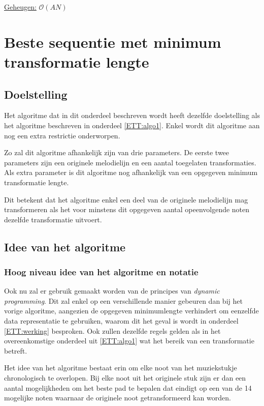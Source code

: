 \begin{center}
\underline{Geheugen:} $\mathcal{O}(AN)$
\end{center}

\section{Beste sequentie met minimum transformatie lengte}
\label{ETT:algo2}

\subsection{Doelstelling}
Het algoritme dat in dit onderdeel beschreven wordt heeft dezelfde doelstelling als het algoritme beschreven in onderdeel \ref{ETT:algo1}. Enkel wordt dit algoritme aan nog een extra restrictie onderworpen.

Zo zal dit algoritme afhankelijk zijn van drie parameters. De eerste twee parameters zijn een originele melodielijn en een aantal toegelaten transformaties. Als extra parameter is dit algoritme nog afhankelijk van een opgegeven minimum transformatie lengte.

Dit betekent dat het algoritme enkel een deel van de originele melodielijn mag transformeren als het voor minstens dit opgegeven aantal opeenvolgende noten dezelfde transformatie uitvoert.

\subsection{Idee van het algoritme}
\subsubsection{Hoog niveau idee van het algoritme en notatie}
Ook nu zal er gebruik gemaakt worden van de principes van \textit{dynamic programming}. Dit zal enkel op een verschillende manier gebeuren dan bij het vorige algoritme, aangezien de opgegeven minimumlengte verhindert om eenzelfde data representatie te gebruiken, waarom dit het geval is wordt in onderdeel \ref{ETT:werking} besproken. Ook zullen dezelfde regels gelden als in het overeenkomstige onderdeel uit \ref{ETT:algo1} wat het bereik van een transformatie betreft.

Het idee van het algoritme bestaat erin om elke noot van het muziekstukje chronologisch te overlopen. Bij elke noot uit het originele stuk zijn er dan een aantal mogelijkheden om het beste pad te bepalen dat eindigt op een van de 14 mogelijke noten waarnaar de originele noot getransformeerd kan worden.
 
